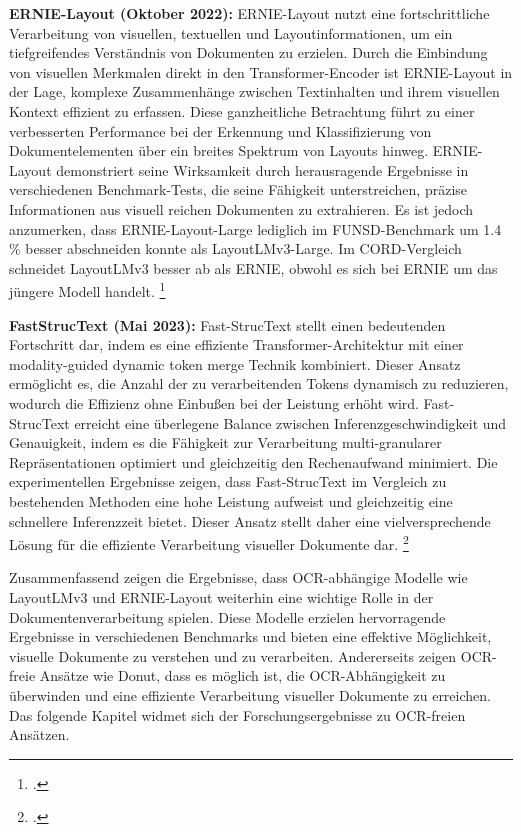 \textbf{ERNIE-Layout (Oktober 2022):} ERNIE-Layout nutzt eine fortschrittliche Verarbeitung von visuellen, textuellen und Layoutinformationen, um ein tiefgreifendes Verständnis von Dokumenten zu erzielen. Durch die Einbindung von visuellen Merkmalen direkt in den Transformer-Encoder ist ERNIE-Layout in der Lage, komplexe Zusammenhänge zwischen Textinhalten und ihrem visuellen Kontext effizient zu erfassen. Diese ganzheitliche Betrachtung führt zu einer verbesserten Performance bei der Erkennung und Klassifizierung von Dokumentelementen über ein breites Spektrum von Layouts hinweg. ERNIE-Layout demonstriert seine Wirksamkeit durch herausragende Ergebnisse in verschiedenen Benchmark-Tests, die seine Fähigkeit unterstreichen, präzise Informationen aus visuell reichen Dokumenten zu extrahieren. Es ist jedoch anzumerken, dass ERNIE-Layout-Large lediglich im FUNSD-Benchmark um 1.4 \% besser abschneiden konnte als LayoutLMv3-Large. Im CORD-Vergleich schneidet LayoutLMv3 besser ab als ERNIE, obwohl es sich bei ERNIE um das jüngere Modell handelt. \footcites[Vgl. dazu ausführlich][S. 7 f.]{peng_ernie-layout_2022}

\textbf{FastStrucText (Mai 2023):} Fast-StrucText stellt einen bedeutenden Fortschritt dar, indem es eine effiziente Transformer-Architektur mit einer modality-guided dynamic token merge Technik kombiniert. Dieser Ansatz ermöglicht es, die Anzahl der zu verarbeitenden Tokens dynamisch zu reduzieren, wodurch die Effizienz ohne Einbußen bei der Leistung erhöht wird. Fast-StrucText erreicht eine überlegene Balance zwischen Inferenzgeschwindigkeit und Genauigkeit, indem es die Fähigkeit zur Verarbeitung multi-granularer Repräsentationen optimiert und gleichzeitig den Rechenaufwand minimiert. Die experimentellen Ergebnisse zeigen, dass Fast-StrucText im Vergleich zu bestehenden Methoden eine hohe Leistung aufweist und gleichzeitig eine schnellere Inferenzzeit bietet. Dieser Ansatz stellt daher eine vielversprechende Lösung für die effiziente Verarbeitung visueller Dokumente dar. \footcites[Vgl. dazu ausführlich][]{zhai_fast-structext_2023}

Zusammenfassend zeigen die Ergebnisse, dass OCR-abhängige Modelle wie LayoutLMv3 und ERNIE-Layout weiterhin eine wichtige Rolle in der Dokumentenverarbeitung spielen. Diese Modelle erzielen hervorragende Ergebnisse in verschiedenen Benchmarks und bieten eine effektive Möglichkeit, visuelle Dokumente zu verstehen und zu verarbeiten. Andererseits zeigen OCR-freie Ansätze wie Donut, dass es möglich ist, die OCR-Abhängigkeit zu überwinden und eine effiziente Verarbeitung visueller Dokumente zu erreichen. Das folgende Kapitel widmet sich der Forschungsergebnisse zu OCR-freien Ansätzen.

